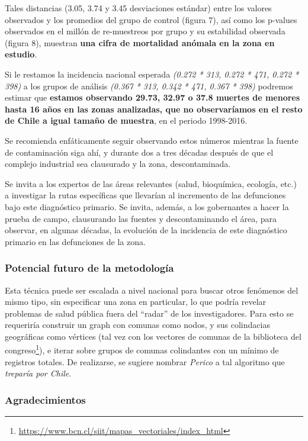 \documentclass[]{article}
\DeclareRobustCommand{\href}[2]{#2\footnote{\url{#1}}}
\begin{document}
Tales distancias (3.05, 3.74 y 3.45 desviaciones estándar) entre los
valores observados y los promedios del grupo de control (figura 7), así
como los p-values observados en el millón de re-muestreos por grupo y su
estabilidad observada (figura 8), muestran \textbf{una cifra de mortalidad anómala en la zona en estudio}.

Si le restamos la incidencia nacional esperada \emph{(0.272 * 313, 0.272
* 471, 0.272 * 398)} a los grupos de análisis \emph{(0.367 * 313, 0.342
* 471, 0.367 * 398)} podremos estimar que \textbf{estamos observando 29.73,
32.97 o 37.8 muertes de menores hasta 16 años en las zonas analizadas, que
no observaríamos en el resto de Chile a igual tamaño de muestra}, en el
periodo 1998-2016.

Se recomienda enfáticamente seguir observando estos números mientras la
fuente de contaminación siga ahí, y durante dos a tres décadas después
de que el complejo industrial sea clausurado y la zona, descontaminada.

Se invita a los expertos de las áreas relevantes (salud, bioquímica,
ecología, etc.) a investigar la rutas específicas que llevarían al
incremento de las defunciones bajo este diagnóstico primario. Se invita,
además, a los gobernantes a hacer la prueba de campo, clausurando las
fuentes y descontaminando el área, para observar, en algunas décadas, la
evolución de la incidencia de este diagnóstico primario en las
defunciones de la zona.

\hypertarget{potencial-futuro-de-la-metodologuxeda}{%
\subsubsection{Potencial futuro de la
metodología}\label{potencial-futuro-de-la-metodologuxeda}}

Esta técnica puede ser escalada a nivel nacional para buscar otros
fenómenos del mismo tipo, sin especificar una zona en particular, lo que
podría revelar problemas de salud pública fuera del ``radar'' de los
investigadores. Para esto se requeriría construir un graph con comunas
como nodos, y sus colindacias geográficas como vértices (tal vez con
\href{https://www.bcn.cl/siit/mapas_vectoriales/index_html}{los vectores
de comunas de la biblioteca del congreso}), e iterar sobre grupos de
comunas colindantes con un mínimo de registros totales. De realizarse,
se sugiere nombrar \emph{Perico} a tal algoritmo que \emph{treparía por
Chile}.

\hypertarget{agradecimientos}{%
\subsubsection{Agradecimientos}\label{agradecimientos}}
\end{document}
